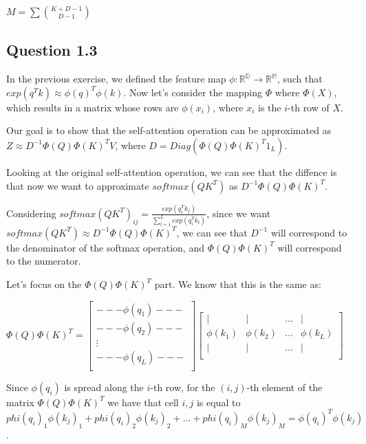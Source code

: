 \documentclass{article}
\begin{document}
$M = \sum \binom{K + D - 1}{D - 1}$

\subsection{Question 1.3}

In the previous exercise, we defined the feature map $\phi: \mathbb{R^D} \rightarrow \mathbb{R^M}$, such that $exp(q^Tk) \approx \phi(q)^T\phi(k)$. 
Now let's consider the mapping $\Phi$ where $\Phi(X)$, which results in a matrix whose rows are $\phi(x_i)$, where $x_i$ is the $i$-th row of $X$.

Our goal is to show that the self-attention operation can be approximated as $Z \approx D^{-1}\Phi(Q) \Phi(K)^T V$, 
where $D = Diag(\Phi(Q) \Phi(K)^T 1_L)$. 

Looking at the original self-attention operation, we can see that the diffence is that now we want to approximate
$softmax(QK^T)$ as $D^{-1}\Phi(Q) \Phi(K)^T$.

Considering $softmax(QK^T)_{ij} = \frac{exp(q_i^Tk_j)}{\sum_{l=1}^L exp(q_i^Tk_l)}$, since we want
$softmax(QK^T) \approx D^{-1}\Phi(Q) \Phi(K)^T$, we can see that $D^{-1}$ will correspond to the denominator of the softmax operation,
and $\Phi(Q) \Phi(K)^T$ will correspond to the numerator.

\bigskip

Let's focus on the $\Phi(Q) \Phi(K)^T$ part. We know that this is the same as:

\medskip

$
    \Phi(Q) \Phi(K)^T = 
    \begin{bmatrix}
        --- \phi(q_1) --- \\
        --- \phi(q_2) --- \\
        \vdots \\
        --- \phi(q_L) --- \\
    \end{bmatrix}
    \begin{bmatrix}
        | & | & \dots & | \\
        \phi(k_1) & \phi(k_2) & \dots & \phi(k_L) \\
        | & | & \dots & | \\
    \end{bmatrix}
$

\medskip

Since $\phi(q_i)$ is spread along the $i$-th row, for the $(i,j)$-th element of the matrix $\Phi(Q) \Phi(K)^T$ we have that cell $i,j$ is equal to $
phi(q_i)_1 \phi(k_j)_1 + phi(q_i)_2 \phi(k_j)_2 + \dots + phi(q_i)_M \phi(k_j)_M = \phi(q_i)^T \phi(k_j)$.
\end{document}
